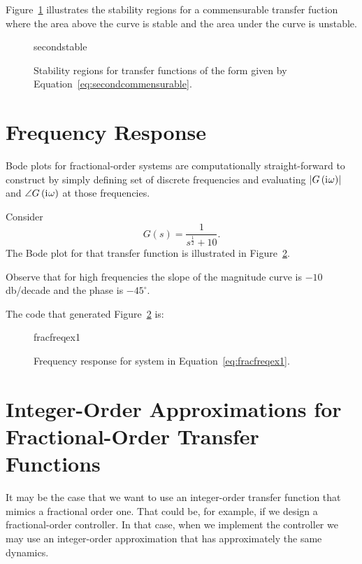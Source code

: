 Figure~\ref{fig:secondstable} illustrates the stability regions for a commensurable transfer fuction where the area above the curve is stable and the area under the curve is unstable.

\begin{figure}
  \centering
  {secondstable}
  \caption{Stability regions for transfer functions of the form given by Equation~\ref{eq:secondcommensurable}.}
  \label{fig:secondstable}
\end{figure}

\section{Frequency Response}
Bode plots for fractional-order systems are computationally straight-forward to construct by simply defining set of discrete frequencies and evaluating $\left| G \left( \mathrm{i}\mkern1mu \omega \right) \right|$ and $\angle G \left( \mathrm{i}\mkern1mu \omega \right)$ at those frequencies. 

\begin{example}
  Consider
  \begin{equation}
    G(s) = \frac{1}{s^\frac{1}{2} + 10}.
    \label{eq:fracfreqex1}
  \end{equation}
  The Bode plot for that transfer function is illustrated in Figure~\ref{fig:fracfreqex1}.

  Observe that for high frequencies the slope of the magnitude curve is $-10$db/decade and the phase is $-45^\circ$.

  The code that generated Figure~\ref{fig:fracfreqex1} is:


\end{example}

\begin{figure}
  \centering
  {fracfreqex1}
  \caption{Frequency response for system in Equation~\ref{eq:fracfreqex1}.}
  \label{fig:fracfreqex1}
\end{figure}

\section{Integer-Order Approximations for Fractional-Order Transfer Functions}
It may be the case that we want to use an integer-order transfer function that mimics a fractional order one. That could be, for example, if we design a fractional-order controller. In that case, when we implement the controller we may use an integer-order approximation that has approximately the same dynamics.

